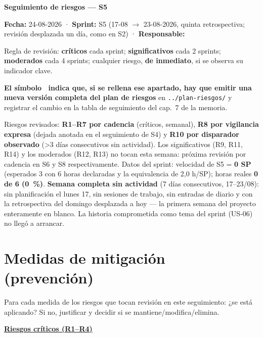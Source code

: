 \documentclass[11pt,a4paper]{article}
\begin{document}
\begin{center}
  {\LARGE\bfseries Seguimiento de riesgos — S5}\\[6pt]
\end{center}

\textbf{Fecha:} 24-08-2026 · \textbf{Sprint:} S5 (17-08 \(\to\) 23-08-2026, quinta retrospectiva; revisión desplazada un día, como en S2) · \textbf{Responsable:} \thesisAuthor

Regla de revisión: \textbf{críticos} cada sprint; \textbf{significativos} cada 2 sprints; \textbf{moderados} cada 4 sprints; cualquier riesgo, \textbf{de inmediato}, si se observa su indicador clave.

\textbf{El símbolo \updatesymbol\ indica que, si se rellena ese apartado, hay que emitir una nueva versión completa del plan de riesgos} en \texttt{../plan-riesgos/} y registrar el cambio en la tabla de seguimiento del cap.~7 de la memoria.

Riesgos revisados: \textbf{R1--R7 por cadencia} (críticos, semanal), \textbf{R8 por vigilancia expresa} (dejada anotada en el seguimiento de S4) y \textbf{R10 por disparador observado} (>3 días consecutivos sin actividad).
Los significativos (R9, R11, R14) y los moderados (R12, R13) no tocan esta semana: próxima revisión por cadencia en S6 y S8 respectivamente.
Datos del sprint: velocidad de S5 = \textbf{0 SP} (esperados 3 con 6 horas declaradas y la equivalencia de 2,0 h/SP); horas reales \textbf{0 de 6 (0~\%)}.
\textbf{Semana completa sin actividad} (7 días consecutivos, 17--23/08): sin planificación el lunes 17, sin sesiones de trabajo, sin entradas de diario y con la retrospectiva del domingo desplazada a hoy — la primera semana del proyecto enteramente en blanco.
La historia comprometida como tema del sprint (US-06) no llegó a arrancar.

\bigline

\section{Medidas de mitigación (prevención)}

Para cada medida de los riesgos que tocan revisión en este seguimiento: ¿se está aplicando?
Si no, justificar y decidir si se mantiene/modifica/elimina.

\underline{\textbf{Riesgos críticos (R1--R4)}}
\end{document}
